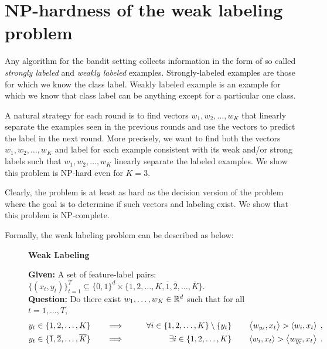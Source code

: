 \section{NP-hardness of the weak labeling problem}

Any algorithm for the bandit setting collects information in the form of so
called \emph{strongly labeled} and \emph{weakly labeled} examples.
Strongly-labeled examples are those for which we know the class label. Weakly
labeled example is an example for which we know that class label can be anything
except for a particular one class.

A natural strategy for each round is to find vectors $w_1, w_2, \dots, w_K$ that
linearly separate the examples seen in the previous rounds and use the vectors
to predict the label in the next round. More precisely, we want to find both the
vectors $w_1, w_2, \dots, w_K$ and label for each example consistent with its
weak and/or strong labels such that $w_1, w_2, \dots, w_K$ linearly separate the
labeled examples. We show this problem is NP-hard even for $K=3$.

Clearly, the problem is at least as hard as the decision version of the problem
where the goal is to determine if such vectors and labeling exist. We show that
this problem is NP-complete.

Formally, the weak labeling problem can be described as below: 
\begin{figure}[H]
\begin{framed}
\begin{center}
    \textbf{Weak Labeling}
\end{center}
\textbf{Given: } A set of feature-label pairs: $\{(x_t, y_t)\}_{t=1}^T \subseteq \{0,1\}^d \times \{1,2,\ldots, K, \overline{1}, \overline{2}, \ldots, \overline{K}\}$. \\
\textbf{Question: } Do there exist $ w_1, \ldots, w_K \in \mathbb{R}^d$ such that for all $t=1, \ldots, T$,  
\begin{align*}
y_t \in \{1,2,\dots,K\} \qquad & \Longrightarrow \qquad & \forall i \in \{1,2,\dots,K\} \setminus \{y_t\} \qquad & \left\langle w_{y_t}, x_t \right\rangle  > \left\langle w_i, x_t \right\rangle \; , \\
y_t \in \{\overline{1}, \overline{2},\dots, \overline{K}\} \qquad & \Longrightarrow & \qquad \exists i \in \{1,2,\dots,K\} \qquad & \left\langle w_i, x_t \right\rangle > \left\langle w_{\overline{y_t}}, x_t \right\rangle \; .
\end{align*}
\end{framed}
\end{figure}



